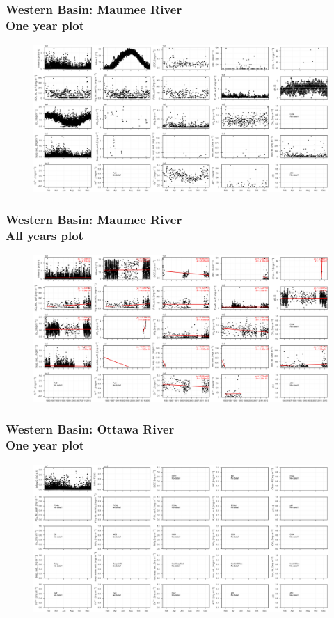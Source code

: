 \documentclass{beamer}
\begin{document}
\begin{frame}
\frametitle{Western Basin: Maumee River\\ One year plot}
\begin{figure}
\includegraphics[width=\textwidth]{rivers/Western basin/plot_1yr maumeeriver.png}
\end{figure}
\end{frame}

\begin{frame}
\frametitle{Western Basin: Maumee River\\ All years plot}
\begin{figure}
\includegraphics[width=\textwidth]{rivers/Western basin/plot_all maumeeriver.png}
\end{figure}
\end{frame}

\begin{frame}
\frametitle{Western Basin: Ottawa River\\ One year plot}
\begin{figure}
\includegraphics[width=\textwidth]{rivers/Western basin/plot_1yr ottawariver.png}
\end{figure}
\end{frame}
\end{document}
